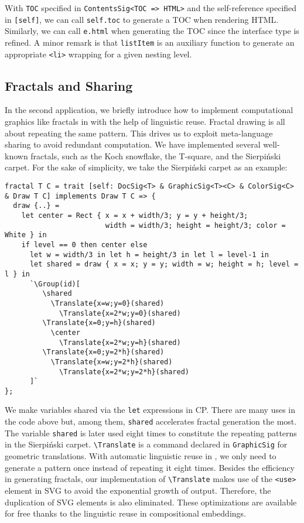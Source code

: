 \noindent With \lstinline{TOC} specified in \lstinline{ContentsSig<TOC => HTML>}
and the self-reference specified in \lstinline{[self]}, we can call
\lstinline{self.toc} to generate a TOC when rendering HTML. Similarly, we can
call \lstinline{e.html} when generating the TOC since the interface type is
refined. A minor remark is that \lstinline{listItem} is an auxiliary function to
generate an appropriate \lstinline{<li>} wrapping for a given nesting level.

\subsection{Fractals and Sharing}

In the second application, we briefly introduce how to implement computational
graphics like fractals in \ExT with the help of linguistic reuse. Fractal
drawing is all about repeating the same pattern. This drives us to exploit
meta-language sharing to avoid redundant computation. We have implemented
several well-known fractals, such as the Koch snowflake, the T-square, and the
Sierpiński carpet. For the sake of simplicity, we take the Sierpiński carpet as
an example:

\begin{lstlisting}
fractal T C = trait [self: DocSig<T> & GraphicSig<T><C> & ColorSig<C> & Draw T C] implements Draw T C => {
  draw {..} =
    let center = Rect { x = x + width/3; y = y + height/3;
                        width = width/3; height = height/3; color = White } in
    if level == 0 then center else
      let w = width/3 in let h = height/3 in let l = level-1 in
      let shared = draw { x = x; y = y; width = w; height = h; level = l } in
      `\Group(id)[
         \shared
           \Translate{x=w;y=0}(shared)
             \Translate{x=2*w;y=0}(shared)
         \Translate{x=0;y=h}(shared)
           \center
             \Translate{x=2*w;y=h}(shared)
         \Translate{x=0;y=2*h}(shared)
           \Translate{x=w;y=2*h}(shared)
             \Translate{x=2*w;y=2*h}(shared)
      ]`
};
\end{lstlisting}

\noindent We make variables shared via the \lstinline{let} expressions in CP.
There are many uses in the code above but, among them, \lstinline{shared}
accelerates fractal generation the most. The variable \lstinline{shared} is
later used eight times to constitute the repeating patterns in the Sierpiński
carpet. \lstinline{\Translate} is a command declared in \lstinline{GraphicSig}
for geometric translations. With automatic linguistic reuse in \ExT, we only
need to generate a pattern once instead of repeating it eight times. Besides the
efficiency in generating fractals, our implementation of \lstinline{\Translate}
makes use of the \lstinline{<use>} element in SVG to avoid the exponential
growth of output. Therefore, the duplication of SVG elements is also eliminated.
These optimizations are available for free thanks to the linguistic reuse in
compositional embeddings.

